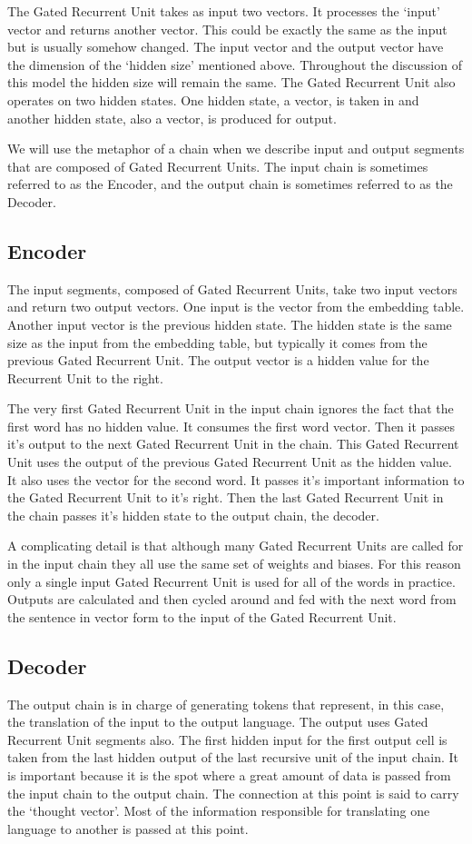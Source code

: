 The Gated Recurrent Unit takes as input two vectors. It processes the `input' vector and returns another vector. This could be exactly the same as the input but is usually somehow changed. The input vector and the output vector have the dimension of the `hidden size' mentioned above. Throughout the discussion of this model the hidden size will remain the same. The Gated Recurrent Unit also operates on two hidden states. One hidden state, a vector, is taken in and another hidden state, also a vector, is produced for output.

We will use the metaphor of a chain when we describe input and output segments that are composed of Gated Recurrent Units. The input chain is sometimes referred to as the Encoder, and the output chain is sometimes referred to as the Decoder.

\subsection*{Encoder}

The input segments, composed of Gated Recurrent Units, take two input vectors and return two output vectors. One input is the vector from the embedding table. Another input vector is the previous hidden state. The hidden state is the same size as the input from the embedding table, but typically it comes from the previous Gated Recurrent Unit. The output vector is a hidden value for the Recurrent Unit to the right.

The very first Gated Recurrent Unit in the input chain ignores the fact that the first word has no hidden value. It consumes the first word vector. Then it passes it's output to the next Gated Recurrent Unit in the chain. This Gated Recurrent Unit uses the output of the previous Gated Recurrent Unit as the hidden value. It also uses the vector for the second word. It passes it's important information to the Gated Recurrent Unit to it's right. Then the last Gated Recurrent Unit in the chain passes it's hidden state to the output chain, the decoder.

A complicating detail is that although many Gated Recurrent Units are called for in the input chain they all use the same set of weights and biases. For this reason only a single input Gated Recurrent Unit is used for all of the words in practice. Outputs are calculated and then cycled around and fed with the next word from the sentence in vector form to the input of the Gated Recurrent Unit. 

\subsection*{Decoder}
The output chain is in charge of generating tokens that represent, in this case, the translation of the input to the output language. The output uses Gated Recurrent Unit segments also. The first hidden input for the first output cell is taken from the last hidden output of the last recursive unit of the input chain. It is important because it is the spot where a great amount of data is passed from the input chain to the output chain. The connection at this point is said to carry the `thought vector'. Most of the information responsible for translating one language to another is passed at this point.

